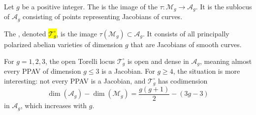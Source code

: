 \begin{definition} \label{definition:torelli_locus_over_a_scheme}
    Let $g$ be a positive integer.
    The  is the image of the  $\tau: \mathcal{M}_g \to \mathcal{A}_g$. It is the sublocus of $\mathcal{A}_g$ consisting of points representing Jacobians of  curves.

    The , denoted \hl{$\mathcal{T}_g^\circ$}, is the image $\tau(\mathcal{M}_g) \subset \mathcal{A}_g$. It consists of all principally polarized abelian varieties of dimension $g$ that are Jacobians of smooth curves.

    For $g = 1, 2, 3$, the open Torelli locus $\mathcal{T}_g^\circ$ is open and dense in $\mathcal{A}_g$, meaning almost every PPAV of dimension $g \leq 3$ is a Jacobian. For $g \geq 4$, the situation is more interesting: not every PPAV is a Jacobian, and $\mathcal{T}_g^\circ$ has codimension
    $$\dim(\mathcal{A}_g) - \dim(\mathcal{M}_g) = \frac{g(g+1)}{2} - (3g-3)$$
    in $\mathcal{A}_g$, which increases with $g$.
\end{definition}
